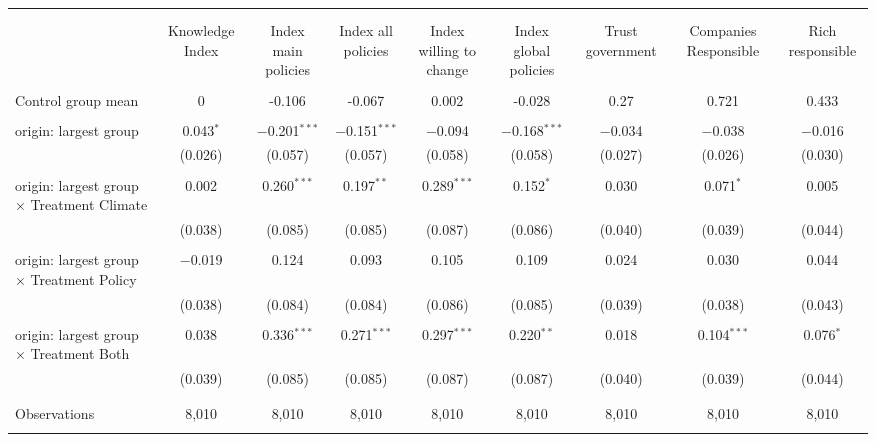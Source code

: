 
\begin{tabular}{@{\extracolsep{5pt}}lcccccccc} 
\\[-1.8ex]\hline 
\hline \\[-1.8ex] 
\\[-1.8ex] & Knowledge Index & Index main policies & Index all policies & Index willing to change & Index global policies & Trust government & Companies Responsible & Rich responsible \\ 
\hline \\[-1.8ex] 
 Control group mean & 0 & -0.106 & -0.067 & 0.002 & -0.028 & 0.27 & 0.721 & 0.433  \\ \hline \\[-1.8ex] origin: largest group & 0.043$^{*}$ & $-$0.201$^{***}$ & $-$0.151$^{***}$ & $-$0.094 & $-$0.168$^{***}$ & $-$0.034 & $-$0.038 & $-$0.016 \\ 
  & (0.026) & (0.057) & (0.057) & (0.058) & (0.058) & (0.027) & (0.026) & (0.030) \\ 
  & & & & & & & & \\ 
 origin: largest group $\times$ Treatment Climate & 0.002 & 0.260$^{***}$ & 0.197$^{**}$ & 0.289$^{***}$ & 0.152$^{*}$ & 0.030 & 0.071$^{*}$ & 0.005 \\ 
  & (0.038) & (0.085) & (0.085) & (0.087) & (0.086) & (0.040) & (0.039) & (0.044) \\ 
  & & & & & & & & \\ 
 origin: largest group $\times$ Treatment Policy & $-$0.019 & 0.124 & 0.093 & 0.105 & 0.109 & 0.024 & 0.030 & 0.044 \\ 
  & (0.038) & (0.084) & (0.084) & (0.086) & (0.085) & (0.039) & (0.038) & (0.043) \\ 
  & & & & & & & & \\ 
 origin: largest group $\times$ Treatment Both & 0.038 & 0.336$^{***}$ & 0.271$^{***}$ & 0.297$^{***}$ & 0.220$^{**}$ & 0.018 & 0.104$^{***}$ & 0.076$^{*}$ \\ 
  & (0.039) & (0.085) & (0.085) & (0.087) & (0.087) & (0.040) & (0.039) & (0.044) \\ 
  & & & & & & & & \\ 
\hline \\[-1.8ex] 

Observations & 8,010 & 8,010 & 8,010 & 8,010 & 8,010 & 8,010 & 8,010 & 8,010 \\ 
\hline 
\hline \\[-1.8ex] 
\end{tabular} 